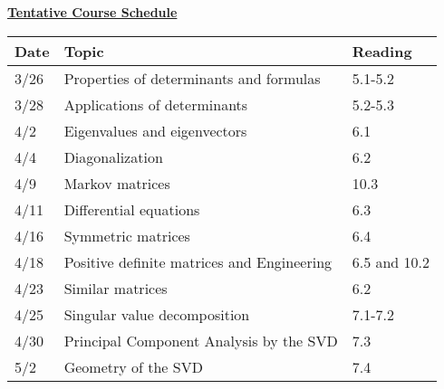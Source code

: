 \documentclass[11pt, a4paper]{article}
\begin{document}
\centerline{\Large \underline{\textbf{Tentative Course Schedule}}}
\vspace{5pt}
\small
\begin{tabular}{ |p{0.5in}|p{4.0in}|p{1.0in}| }
\hline
  \textbf{Date} & \textbf{Topic} & \textbf{Reading}  \\ \hline
 3/26 & Properties of determinants and formulas &  5.1-5.2 \\ \hline
3/28 & Applications of determinants &  5.2-5.3 \\ \hline
4/2 & Eigenvalues and eigenvectors &  6.1 \\ \hline
4/4 & Diagonalization &  6.2 \\ \hline
4/9 & Markov matrices &  10.3 \\ \hline
4/11 & Differential equations &  6.3 \\ \hline
4/16 & Symmetric matrices &  6.4 \\ \hline
4/18 & Positive definite matrices and Engineering &  6.5 and 10.2 \\ \hline
4/23 & Similar matrices &  6.2 \\ \hline
4/25 & Singular value decomposition &  7.1-7.2 \\ \hline
4/30 & Principal Component Analysis by the SVD &  7.3 \\ \hline
5/2 & Geometry of the SVD &  7.4 \\ \hline
\end{tabular}

\end{document}
